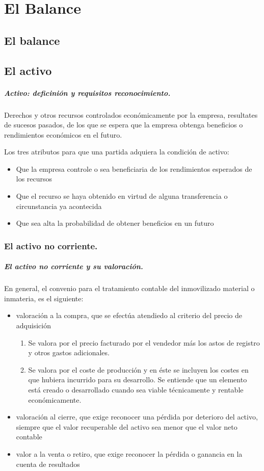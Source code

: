 \chapter{El Balance}
\section{El balance}

\section{El activo}
\paragraph{Activo: deficinión y requisitos reconocimiento.}
Derechos y otros recursos controlados económicamente por la empresa, resultates de sucesos pasados, de los que se espera que la empresa obtenga beneficios o rendimientos económicos en el futuro.

Los tres atributos para que una partida adquiera la condición de activo:
\begin{itemize}
    \item Que la empresa controle o sea beneficiaria de los rendimientos esperados de los recursos
    \item Que el recurso se haya obtenido en virtud de alguna transferencia o circunstancia ya acontecida
    \item Que sea alta la probabilidad de obtener beneficios en un futuro
\end{itemize}

\subsection{El activo no corriente.}
\paragraph{El activo no corriente y su valoración.}
En general, el convenio para el tratamiento contable del inmovilizado material o inmateria, es el siguiente:
\begin{itemize}
    \item valoración a la compra, que se efectúa atendiedo al criterio del precio de adquisición
    \begin{enumerate}
        \item Se valora por el precio facturado por el vendedor más los astos de registro y otros gastos adicionales.
        \item Se valora por el coste de producción y en éste se incluyen los costes en que hubiera incurrido para su desarrollo. Se entiende que un elemento está creado o desarrollado cuando sea viable técnicamente y rentable económicamente.
    \end{enumerate}
    \item valoración al cierre, que exige reconocer una pérdida por deterioro del activo, siempre que el valor recuperable del activo sea menor que el valor neto contable
    \item valor a la venta o retiro, que exige reconocer la pérdida o ganancia en la cuenta de resultados
\end{itemize}

